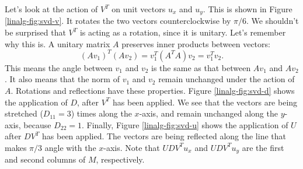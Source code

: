 \documentclass{article}
\theoremstyle{definition}
\begin{document}
Let's look at the action of $V^T$ on unit vectors $u_x$ and $u_y$. This is shown in Figure \ref{linalg-fig:svd-v}. It rotates the two vectors counterclockwise by $\pi/6$. We shouldn't be surprised that $V^T$ is acting as a rotation, since it is unitary. Let's remember why this is. A unitary matrix $A$ preserves inner products between vectors:
\begin{equation}
    (Av_1)^T(Av_2) = v_1^T(A^TA)v_2 = v_1^Tv_2.
\end{equation}
This means the angle between $v_1$ and $v_2$ is the same as that between $Av_1$ and $Av_2$. It also means that the norm of $v_1$ and $v_2$ remain unchanged under the action of $A$. Rotations and reflections have these properties.
Figure \ref{linalg-fig:svd-d} shows the application of $D$, after $V^T$ has been applied. We see that the vectors are being stretched ($D_{11}=3$) times along the $x$-axis, and remain unchanged along the $y$-axis, because $D_{22}=1$.
Finally, Figure \ref{linalg-fig:svd-u} shows the application of $U$ after $DV^T$ has been applied. The vectors are being reflected along the line that makes $\pi/3$ angle with the $x$-axis. Note that $UDV^Tu_x$ and $UDV^Tu_y$ are the first and second columns of $M$, respectively.
\end{document}
